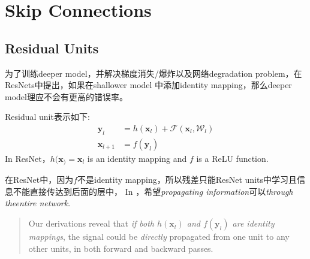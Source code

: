 \chapter{Skip Connections}

\section{Residual Units}
为了训练deeper model，并解决梯度消失/爆炸以及网络degradation problem，在ResNets\cite{He2016resnet}中提出，如果在shallower model
中添加identity mapping，那么deeper model理应不会有更高的错误率。
\par
Residual unit表示如下:
\begin{equation}
    \begin{split}
        \mathbf{y}_l &= h(\mathbf{x}_l) + \mathcal{F}(\mathbf{x}_l, \mathcal{W}_l) \\
        \mathbf{x}_{l+1} &= f(\mathbf{y}_l)
    \end{split}
\end{equation}
In ResNet，$h(\mathbf{x}_) = \mathbf{x}_l$ is an identity mapping and $f$ is a ReLU function.
\par
在ResNet中，因为$f$不是identity mapping，所以残差只能ResNet units中学习且信息不能直接传达到后面的层中，
In \cite{He2016identity}，希望\textit{propagating information}可以\textit{through theentire network}.
\begin{quotation}
    Our derivations reveal that \textit{if both $h(\mathbf{x}_l)$ and
$f(\mathbf{y}_l)$ are identity mappings}, the signal could be \textit{directly} 
propagated from one unit to any other units, in both forward and backward passes.\cite{He2016identity}
\end{quotation}

